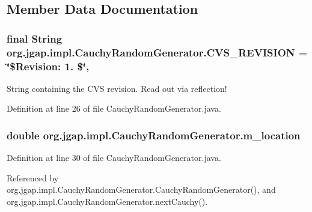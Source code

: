 \subsection{Member Data Documentation}
\hypertarget{classorg_1_1jgap_1_1impl_1_1_cauchy_random_generator_a265f6cc2785a476a7ea6de340a6f3a35}{
\subsubsection[{C\-V\-S\-\_\-\-R\-E\-V\-I\-S\-I\-O\-N}]{\setlength{\rightskip}{0pt plus 5cm}final String org.\-jgap.\-impl.\-Cauchy\-Random\-Generator.\-C\-V\-S\-\_\-\-R\-E\-V\-I\-S\-I\-O\-N = \char`\"{}\$Revision\-: 1. \$\char`\"{}\hspace{0.3cm}{\ttfamily [static]}, {\ttfamily [private]}}}\label{classorg_1_1jgap_1_1impl_1_1_cauchy_random_generator_a265f6cc2785a476a7ea6de340a6f3a35}
String containing the C\-V\-S revision. Read out via reflection! 

Definition at line 26 of file Cauchy\-Random\-Generator.\-java.

\hypertarget{classorg_1_1jgap_1_1impl_1_1_cauchy_random_generator_a30a8446618e2ba879e31a09fbfcd5818}{
\subsubsection[{m\-\_\-location}]{\setlength{\rightskip}{0pt plus 5cm}double org.\-jgap.\-impl.\-Cauchy\-Random\-Generator.\-m\-\_\-location\hspace{0.3cm}{\ttfamily [private]}}}\label{classorg_1_1jgap_1_1impl_1_1_cauchy_random_generator_a30a8446618e2ba879e31a09fbfcd5818}


Definition at line 30 of file Cauchy\-Random\-Generator.\-java.



Referenced by org.\-jgap.\-impl.\-Cauchy\-Random\-Generator.\-Cauchy\-Random\-Generator(), and org.\-jgap.\-impl.\-Cauchy\-Random\-Generator.\-next\-Cauchy().


